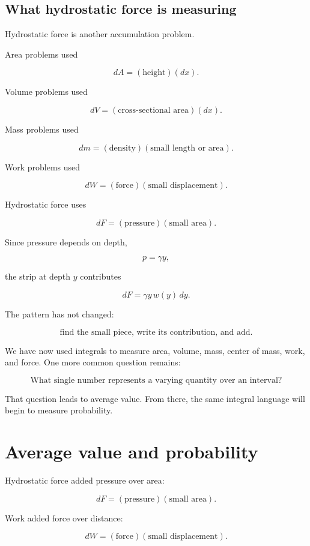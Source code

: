 \subsection{What hydrostatic force is measuring}
\label{subsec:what-hydrostatic-force-measures}

Hydrostatic force is another accumulation problem.

Area problems used

\[
dA=(\text{height})(dx).
\]

Volume problems used

\[
dV=(\text{cross-sectional area})(dx).
\]

Mass problems used

\[
dm=(\text{density})(\text{small length or area}).
\]

Work problems used

\[
dW=(\text{force})(\text{small displacement}).
\]

Hydrostatic force uses

\[
dF=(\text{pressure})(\text{small area}).
\]

Since pressure depends on depth,

\[
p=\gamma y,
\]

the strip at depth \(y\) contributes

\[
dF=\gamma y\,w(y)\,dy.
\]

The pattern has not changed:

\[
\boxed{
\text{find the small piece, write its contribution, and add.}
}
\]

We have now used integrals to measure area, volume, mass, center of mass, work, and
force.  One more common question remains:

\[
\text{What single number represents a varying quantity over an interval?}
\]

That question leads to average value.  From there, the same integral language will begin
to measure probability.
\section{Average value and probability}
\label{sec:average-value-probability}

Hydrostatic force added pressure over area:

\[
dF=(\text{pressure})(\text{small area}).
\]

Work added force over distance:

\[
dW=(\text{force})(\text{small displacement}).
\]

